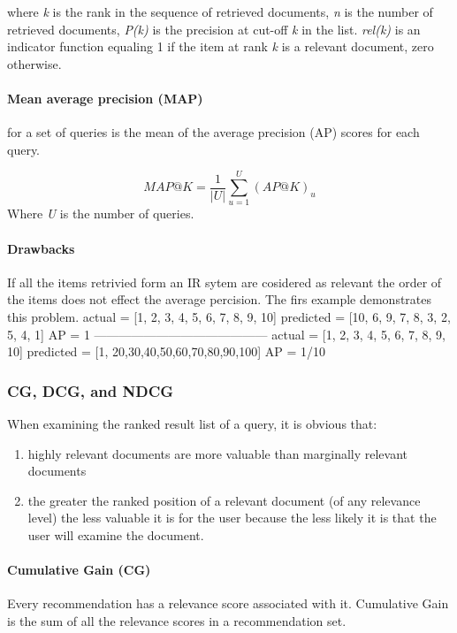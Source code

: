 where \emph{k} is the rank in the sequence of retrieved documents, \emph{n} is the number of retrieved documents, \emph{P(k)} is the precision at cut-off \emph{k} in the list. \emph{rel(k)}
is an indicator function equaling 1 if the item at rank \emph{k} is a relevant document, zero otherwise.

\paragraph*{Mean average precision (MAP)} for a set of queries is the mean of the average precision (AP) scores for each query.

\begin{equation}
	MAP@K = \frac{1}{|U|}\sum_{u=1}^{U}(AP@K)_{u}
	\label{eq:map@k}
\end{equation}
Where \emph{U} is the number of queries.

\paragraph*{Drawbacks}
If all the items retrivied form an IR sytem are cosidered as relevant the order of the items does not effect the average percision.
 The firs example demonstrates this problem.
actual = [1, 2, 3, 4, 5, 6, 7, 8, 9, 10]
predicted = [10, 6, 9, 7, 8, 3, 2, 5, 4, 1]
AP = 1
------------------------------------------
actual = [1, 2, 3, 4, 5, 6, 7, 8, 9, 10]
predicted = [1, 20,30,40,50,60,70,80,90,100]
AP = 1/10

\subsubsection{CG, DCG, and NDCG}
\label{CG, DCG, and NDCG}
When examining the ranked result list of a query, it is obvious that:
\begin{enumerate}
	\item highly relevant documents are more valuable than marginally relevant documents
	\item the greater the ranked position of a relevant document (of any relevance level) the less valuable it is for the user because the less likely it is that the user will examine the document.
\end{enumerate}

\paragraph*{Cumulative Gain (CG)}
Every recommendation has a relevance score associated with it. Cumulative Gain is the sum of all the relevance scores in a recommendation set.

